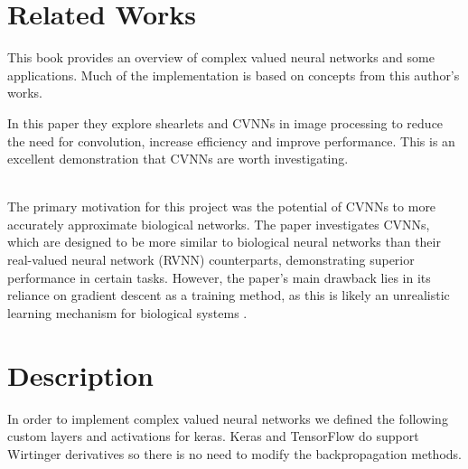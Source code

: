 \documentclass{article}
\let\citep\parencite   %
\begin{document}
\section{Related Works}
\begin{center}\textbf{}\end{center}
This book provides an overview of complex valued neural networks and some applications. Much of the implementation is based on concepts from this author's works.\\
\begin{center}\textbf{}\end{center}
In this paper they explore shearlets and CVNNs in image processing to reduce the need for convolution, increase efficiency and improve performance. This is an excellent demonstration that CVNNs are worth investigating. \\ \\
\begin{center}\textbf{}\end{center}
The primary motivation for this project was the potential of CVNNs to more accurately approximate biological networks. The paper investigates CVNNs, which are designed to be more similar to biological neural networks than their real-valued neural network (RVNN) counterparts, demonstrating superior performance in certain tasks. However, the paper's main drawback lies in its reliance on gradient descent as a training method, as this is likely an unrealistic learning mechanism for biological systems \citep{hintonforwardforward}.

\section{Description}
In order to implement complex valued neural networks we defined the following custom layers and activations for keras. Keras and TensorFlow do support Wirtinger derivatives so there is no need to modify the backpropagation methods. \\
\end{document}
